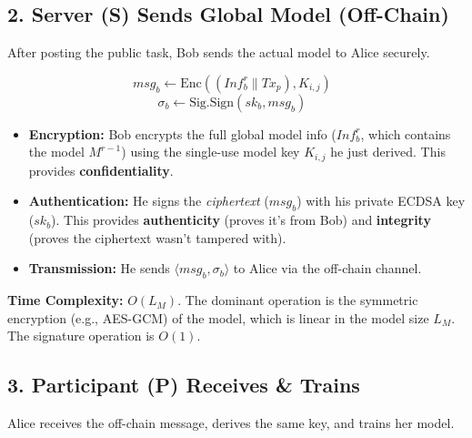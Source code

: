 \documentclass[12pt]{article}
\begin{document}
\subsection*{2. Server (S) Sends Global Model (Off-Chain)}
After posting the public task, Bob sends the actual model to Alice securely.

\[
msg_b \leftarrow \text{Enc}((Inf_b^r \parallel Tx_p), K_{i,j}) \text{ }
\]
\[
\sigma_b \leftarrow \text{Sig.Sign}(sk_b, msg_b) \text{ }
\]
\begin{itemize}
    \item \textbf{Encryption:} Bob encrypts the full global model info (\( Inf_b^r \), which contains the model \( M^{r-1} \)) using the single-use model key \( K_{i,j} \) he just derived. This provides \textbf{confidentiality}.
    \item \textbf{Authentication:} He signs the \textit{ciphertext} (\( msg_b \)) with his private ECDSA key (\( sk_b \)). This provides \textbf{authenticity} (proves it's from Bob) and \textbf{integrity} (proves the ciphertext wasn't tampered with).
    \item \textbf{Transmission:} He sends \( \langle msg_b, \sigma_b \rangle \) to Alice via the off-chain channel.
\end{itemize}
\textbf{Time Complexity:} \( O(L_M) \). The dominant operation is the symmetric encryption (e.g., AES-GCM) of the model, which is linear in the model size \( L_M \). The signature operation is \( O(1) \).

\subsection*{3. Participant (P) Receives \& Trains}
Alice receives the off-chain message, derives the same key, and trains her model.
\end{document}
